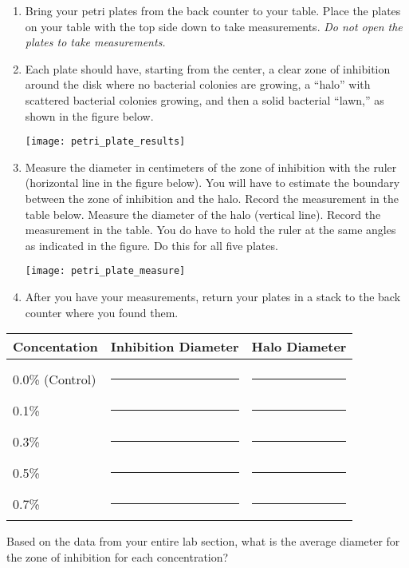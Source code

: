 \documentclass[12pt]{exam}
\begin{document}
\begin{questions}
\begin{enumerate}

	\item Bring your petri plates from the back counter to your table. Place the plates on your table with the top side down to take measurements. \emph{Do not open the plates to take measurements.} 
	
	\item Each plate should have, starting from the center, a clear zone of inhibition around the disk where no bacterial colonies are growing, a “halo” with scattered bacterial colonies growing, and then a solid bacterial “lawn,” as shown in the figure below.
	
		{\centering\texttt{[image: petri\_plate\_results]}\par
		}

	\item Measure the diameter in centimeters of the zone of inhibition with the ruler (horizontal line in the figure below). You will have to estimate the boundary between the zone of inhibition and the halo. Record the measurement in the table below. Measure the diameter of the halo (vertical line). Record the measurement in the table. You do have to hold the ruler at the same angles as indicated in the figure. Do this for all five plates.

		{\centering\texttt{[image: petri\_plate\_measure]}\par
		}

	\item After you have your measurements, return your plates in a stack to the back counter where you found them.
	
\end{enumerate}

\begin{longtable}[c]{lcc}
	\toprule
		Concentation	&	Inhibition Diameter	&	Halo Diameter \tabularnewline
	\midrule
		& & \tabularnewline[0.5em]
		0.0\% (Control)	& \rule{0.75in}{0.4pt} & \rule{0.75in}{0.4pt} \tabularnewline[1.5em]
		0.1\%	& \rule{0.75in}{0.4pt} & \rule{0.75in}{0.4pt} \tabularnewline[1.5em]
		0.3\%	& \rule{0.75in}{0.4pt} & \rule{0.75in}{0.4pt} \tabularnewline[1.5em]
		0.5\%	& \rule{0.75in}{0.4pt} & \rule{0.75in}{0.4pt} \tabularnewline[1.5em]
		0.7\%	& \rule{0.75in}{0.4pt} & \rule{0.75in}{0.4pt} \tabularnewline
	\bottomrule
\end{longtable}

\question \label{ques:zoi}
Based on the data from your entire lab section, what is the average diameter for the zone of inhibition for each concentration?


\end{questions}
\end{document}
